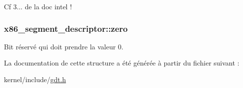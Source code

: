 Cf 3... de la doc intel ! \hypertarget{structx86__segment__descriptor_a4cbd016599f85d6a2060c31d7714dbbd}{
\subsubsection[{zero}]{ x86\-\_\-segment\-\_\-descriptor\-::zero}}\label{structx86__segment__descriptor_a4cbd016599f85d6a2060c31d7714dbbd}
Bit réservé qui doit prendre la valeur 0. 

La documentation de cette structure a été générée à partir du fichier suivant \-:\begin{DoxyCompactItemize}
\item 
kernel/include/\hyperlink{gdt_8h}{gdt.\-h}\end{DoxyCompactItemize}
